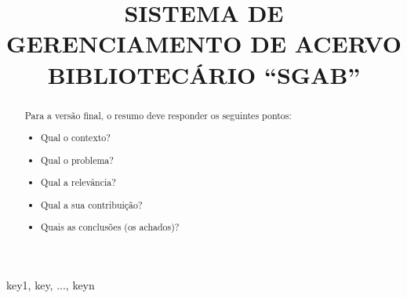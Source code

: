 \documentclass[conference]{IEEEtran}
\begin{document}
\title{SISTEMA DE GERENCIAMENTO DE ACERVO BIBLIOTECÁRIO “SGAB”}

\author{
\and
{}
\and
{}
}

\maketitle

\begin{abstract}
Para a versão final, o resumo deve responder os seguintes pontos:
\begin{itemize}
    \item Qual o contexto?
    \item Qual o problema?
    \item Qual a relevância?
    \item Qual a sua contribuição?
    \item Quais as conclusões (os achados)?
\end{itemize}
\end{abstract}

\begin{IEEEkeywords}
key1, key, ..., keyn
\end{IEEEkeywords}




\end{document}
